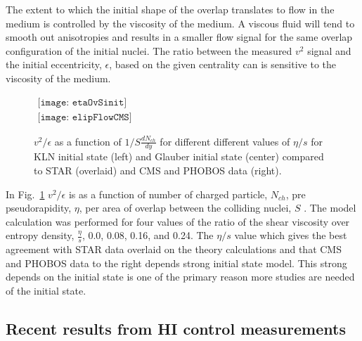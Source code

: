       The extent to which the initial shape of the overlap translates to flow
        in the medium is controlled by the viscosity of the medium. 
      A viscous fluid will tend to smooth out anisotropies and results in 
        a smaller flow signal for the same overlap configuration of the initial
        nuclei. 
      The ratio between the measured $v^{2}$ signal and the initial 
        eccentricity, $\epsilon$, based on the given centrality can is sensitive
        to the viscosity of the medium. 

      \begin{figure}[!Hhbt]
        \centering
        $ \begin{array}{cc}
          \texttt{[image: etaOvSinit]} \\
          \texttt{[image: elipFlowCMS]}
        \end{array} $
        \caption{$v^{2}/\epsilon$  as a function of $1/S \frac{dN_{ch}}{dy}$
          for different different values of $\eta/s$ for KLN initial state 
          (left) and Glauber initial state (center) compared to STAR (overlaid)
          and CMS and PHOBOS data (right).}
        \label{fig:elipFlow}
      \end{figure}

      In Fig.~\ref{fig:elipFlow} $v^{2}/\epsilon$ is as a function of number 
        of charged particle, $N_{ch}$, pre pseudorapidity, $\eta$, per area of 
        overlap between the colliding nuclei, $S$ \cite{etaOvSinit}. 
      The model calculation was performed for four values of the ratio of the 
        shear viscosity over entropy density, $\frac{\eta }{s}$, 0.0, 0.08, 
        0.16, and 0.24.
      The $\eta/s$ value which gives the best agreement with STAR data\cite{starFlow}
        overlaid on the theory calculations and that CMS and PHOBOS data to
        the right depends strong initial state model.
      This strong depends on the initial state is one of the primary reason
        more studies are needed of the initial state. 
      
    \subsection{Recent results from HI control measurements}
